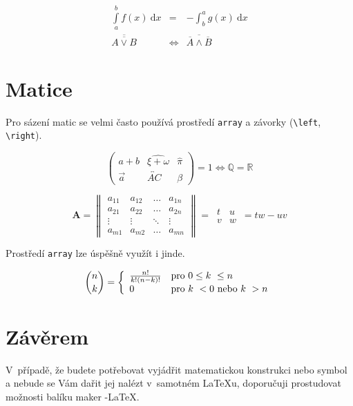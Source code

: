 \documentclass[11pt, twocolumn, a4paper]{article}
\begin{document}
\begin{eqnarray}
    \int\limits_a^b f(x)\ \mathrm{d}x &=& -\int_b^a g(x)\  \mathrm{d}x\\
     \overline{\overline{ A \vee B}} &\Leftrightarrow& \overline{\overline{A} \wedge \overline{B}} \quad
\end{eqnarray}

\section{Matice}

Pro sázení matic se velmi často používá prostředí \texttt{array}
a závorky (\verb|\left|, \verb|\right|).

\[ \left( \begin{array}{ccc}
a+b & \widehat{\xi+\omega} & \hat{\pi} \\
\vec{a} & \overleftrightarrow{AC} & \beta \end{array} \right) =1 \Longleftrightarrow \mathbb{Q}=\mathbb{R}\]


$$\mathbf{A}=\left\|\begin{array}{cccc}
a_{11} & a_{12} & \ldots & a_{1n} \\
a_{21} & a_{22} & \ldots & a_{2n} \\
\vdots & \vdots & \ddots & \vdots \\
a_{m1} & a_{m2} & \ldots & a_{mn}
\end{array}\right\| =
\begin{array}{|cc|}
\,t&u\, \\
\,v&w\,
\end{array} = tw\!-\!uv
$$

Prostředí \texttt{array} lze úspěšně využít i jinde.



$$ \binom{n}{k} = \left\{\begin{array}{l l}
    \frac{n!}{k!(n-k)!} & \text{pro } 0 \leq k\ \leq n  \\
0 & \text{pro } k\ < 0 \text{ nebo } k\ > n
\end{array} \right. $$


\section{Závěrem}

V~případě, že budete potřebovat vyjádřit matematickou
konstrukci nebo symbol a nebude se Vám dařit jej nalézt
v~samotném \LaTeX u, doporučuji prostudovat možnosti balíku
maker \AmS-\LaTeX .
\end{document}
